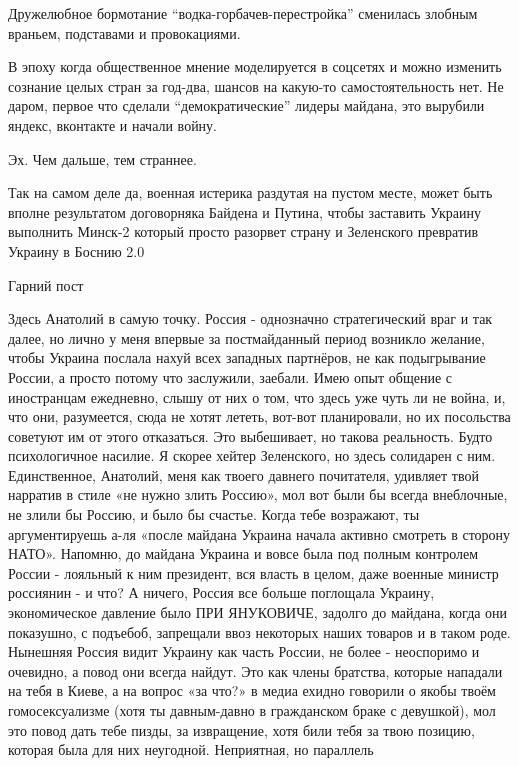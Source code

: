 \begin{itemize}
Дружелюбное бормотание \enquote{водка-горбачев-перестройка} сменилась злобным враньем,
подставами и провокациями.

В эпоху когда общественное мнение моделируется в соцсетях и можно изменить
сознание целых стран за год-два, шансов на какую-то самостоятельность нет. Не
даром, первое что сделали \enquote{демократические} лидеры майдана, это вырубили
яндекс, вконтакте и начали войну.

Эх. Чем дальше, тем страннее.


Так на самом деле да, военная истерика раздутая на пустом месте, может быть
вполне результатом договорняка Байдена и Путина, чтобы заставить Украину
выполнить Минск-2 который просто разорвет страну и Зеленского превратив Украину
в Боснию 2.0

Гарний пост


Здесь Анатолий в самую точку. Россия - однозначно стратегический враг и так
далее, но лично у меня впервые за постмайданный период возникло желание, чтобы
Украина послала нахуй всех западных партнёров, не как подыгрывание России, а
просто потому что заслужили, заебали. Имею опыт общение с иностранцам
ежедневно, слышу от них о том, что здесь уже чуть ли не война, и, что они,
разумеется, сюда не хотят лететь, вот-вот планировали, но их посольства
советуют им от этого отказаться. Это выбешивает, но такова реальность. Будто
психологичное насилие. Я скорее хейтер Зеленского, но здесь солидарен с ним.
Единственное, Анатолий, меня как твоего давнего почитателя, удивляет твой
нарратив в стиле «не нужно злить Россию», мол вот были бы всегда внеблочные, не
злили бы Россию, и было бы счастье. Когда тебе возражают, ты аргументируешь
а-ля «после майдана Украина начала активно смотреть в сторону НАТО». Напомню,
до майдана Украина и вовсе была под полным контролем России - лояльный к ним
президент, вся власть в целом, даже военные министр россиянин - и что? А
ничего, Россия все больше поглощала Украину, экономическое давление было ПРИ
ЯНУКОВИЧЕ, задолго до майдана, когда они показушно, с подъебоб, запрещали ввоз
некоторых наших товаров и в таком роде. Нынешняя Россия видит Украину как часть
России, не более - неоспоримо и очевидно, а повод они всегда найдут. Это как
члены братства, которые нападали на тебя в Киеве, а на вопрос «за что?» в медиа
ехидно говорили о якобы твоём гомосексуализме (хотя ты давным-давно в
гражданском браке с девушкой), мол это повод дать тебе пизды, за извращение,
хотя били тебя за твою позицию, которая была для них неугодной. Неприятная, но
параллель


\end{itemize}
